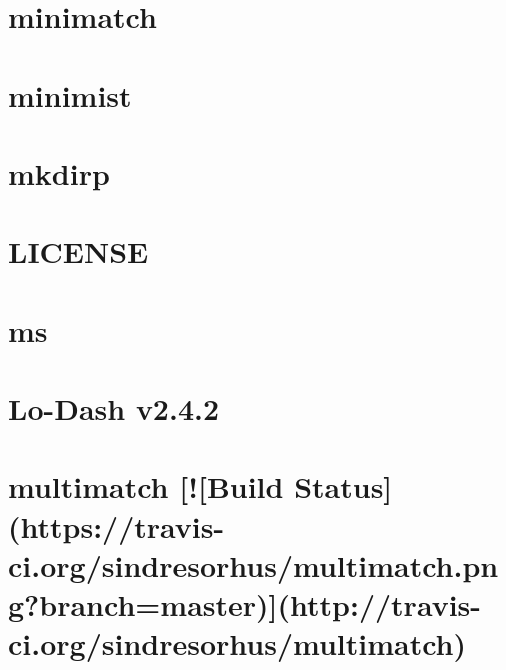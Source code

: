 \documentclass[twoside]{book}
\newcommand{\+}{\discretionary{\mbox{\scriptsize$\hookleftarrow$}}{}{}}
\begin{document}
\chapter{minimatch}
\label{md_app_web_node_modules_minimatch__r_e_a_d_m_e}

\chapter{minimist}
\label{md_app_web_node_modules_minimist_readme}

\chapter{mkdirp}
\label{md_app_web_node_modules_mkdirp__r_e_a_d_m_e}

\chapter{L\+I\+C\+E\+N\+SE}
\label{md_app_web_node_modules_ms__l_i_c_e_n_s_e}

\chapter{ms}
\label{md_app_web_node_modules_ms__r_e_a_d_m_e}

\chapter{Lo-\/\+Dash v2.4.2}
\label{md_app_web_node_modules_multimatch_node_modules_lodash__r_e_a_d_m_e}

\chapter{multimatch \mbox{[}!\mbox{[}Build Status\mbox{]}(https\+://travis-\/ci.org/sindresorhus/multimatch.png?branch=master)\mbox{]}(http\+://travis-\/ci.org/sindresorhus/multimatch)}
\label{md_app_web_node_modules_multimatch_readme}

\end{document}
